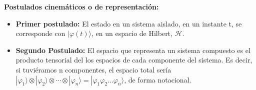 \textbf{Postulados cinemáticos o de representación:}
\begin{itemize}
    \item \textbf{Primer postulado:} El estado en un sistema aislado, en un instante t, se corresponde con $| \varphi (t) \rangle$, en un espacio de Hilbert, $\mathscr{H}$.
    
    \item \textbf{Segundo Postulado:} El espacio que representa un sistema compuesto es el producto tensorial del los espacios de cada componente del sistema. Es decir, si tuviéramos n componentes, el espacio total sería $|\varphi_{1}\rangle \otimes |\varphi_{2}\rangle \otimes \dotsi \otimes |\varphi_{n}\rangle = |\varphi_{1}\varphi_{2}\dotso \varphi_{n}\rangle$, de forma notacional.
\end{itemize}


